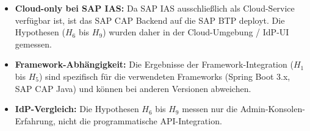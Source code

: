 \begin{itemize}
    \item \textbf{Cloud-only bei SAP IAS:} Da \ac{SAP IAS} ausschließlich als Cloud-Service verfügbar ist, ist das \ac{SAP CAP} Backend auf die \ac{SAP BTP} deployt. Die Hypothesen ($H_6$ bis $H_9$) wurden daher in der Cloud-Umgebung / \ac{IdP}-UI gemessen.

    \item \textbf{Framework-Abhängigkeit:} Die Ergebnisse der Framework-Integration ($H_1$ bis $H_5$) sind spezifisch für die verwendeten Frameworks (Spring Boot 3.x, SAP CAP Java) und können bei anderen Versionen abweichen.

    \item \textbf{IdP-Vergleich:} Die Hypothesen $H_6$ bis $H_9$ messen nur die Admin-Konsolen-Erfahrung, nicht die programmatische API-Integration.
\end{itemize}

